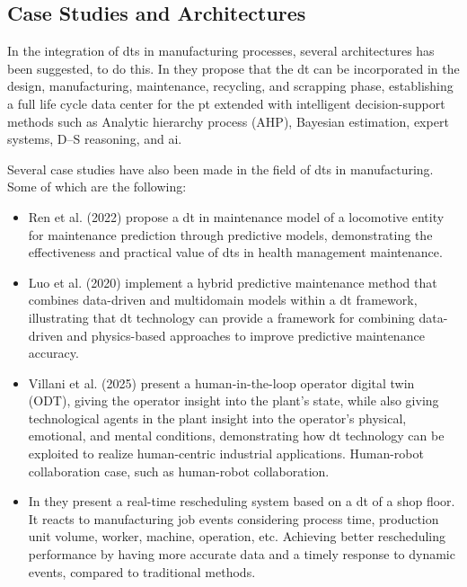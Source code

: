 \subsection{Case Studies and Architectures}
In the integration of \ac{dt}s in manufacturing processes, several architectures has been suggested, to do this.
In\cite{complexEquibment9690056} they propose that the \ac{dt} can be incorporated in the design, manufacturing, maintenance, recycling, and scrapping phase, establishing a full life cycle data center for the \ac{pt} extended with intelligent decision-support methods such as Analytic hierarchy process (AHP), Bayesian estimation, expert systems, D–S reasoning, and \ac{ai}.

Several case studies have also been made in the field of \ac{dt}s in manufacturing. Some of which are the following:

\begin{itemize}
    \item Ren et al. (2022) \cite{complexEquibment9690056} propose a \ac{dt} in maintenance model of a locomotive entity for maintenance prediction through predictive models, demonstrating the effectiveness and practical value of \ac{dt}s in health management maintenance.
    \item Luo et al. (2020) \cite{LUO2020101974} implement a hybrid predictive maintenance method that combines data-driven and multidomain models within a \ac{dt} framework, illustrating that \ac{dt} technology can provide a framework for combining data-driven and physics-based approaches to improve predictive maintenance accuracy. 
    \item Villani et al. (2025) \cite{human-centric-DT-case-10564577} present a human-in-the-loop operator digital twin (ODT), giving the operator insight into the plant's state, while also giving technological agents in the plant insight into the operator's physical, emotional, and mental conditions, demonstrating how \ac{dt} technology can be exploited to realize human-centric industrial applications.
    Human-robot collaboration case, such as human-robot collaboration.
    \item In \cite{schedule8821409} they present a real-time rescheduling system based on a \ac{dt} of a shop floor.
    It reacts to manufacturing job events considering process time, production unit volume, worker, machine, operation, etc. Achieving better rescheduling performance by having more accurate data and a timely response to dynamic events, compared to traditional methods. 
\end{itemize}


